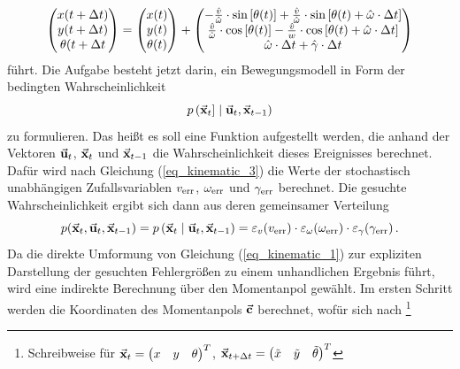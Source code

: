 \begin{equation}
\label{eq_kinematic_3}
\begin{pmatrix}
x(t+\Delta t) \\ y(t+\Delta t) \\ \theta(t+\Delta t
\end{pmatrix} 
=
\begin{pmatrix}
x(t) \\ y(t) \\ \theta(t)
\end{pmatrix} + \begin{pmatrix}
-\frac{\hat{v}}{\hat{\omega}}\cdot\text{sin}\left[ {\theta(t)} \right] + \frac{\hat{v}}{\hat{\omega}}\cdot \text{sin}\left[ {\theta(t)+\hat{\omega} \cdot \Delta t} \right] \\
\frac{\hat{v}}{\hat{\omega}}\cdot \text{cos}\left[ {\theta(t)} \right] - \frac{\hat{v}}{w}\cdot \text{cos}\left[ {\theta(t)+\hat{\omega} \cdot \Delta t} \right]\\
\hat{\omega}\cdot \Delta t + \hat{\gamma}\cdot \Delta t
\end{pmatrix}
\end{equation}
führt. Die Aufgabe besteht jetzt darin, ein Bewegungsmodell in Form der bedingten Wahrscheinlichkeit
\begin{equation}
p\left({\vec{\mathbf{x}}_t]} \hspace{1mm} \vert \hspace{1mm} {\vec{\mathbf{u}}_t, \vec{\mathbf{x}}_{t-1}}\right)
\end{equation}
zu formulieren. Das heißt es soll eine Funktion aufgestellt werden, die anhand der Vektoren $\vec{\mathbf{u}}_t$, $\vec{\mathbf{x}}_t$ und $\vec{\mathbf{x}}_{t-1}$ die Wahrscheinlichkeit dieses Ereignisses berechnet. Dafür wird nach Gleichung (\ref{eq_kinematic_3}) die Werte der stochastisch unabhängigen Zufallsvariablen $v_{\text{err}}$, $\omega_{\text{err}}$ und $\gamma_{\text{err}}$ berechnet. Die gesuchte Wahrscheinlichkeit ergibt sich dann aus deren gemeinsamer Verteilung
\begin{equation}
p(\vec{\mathbf{x}}_t, \vec{\mathbf{u}}_t, \vec{\mathbf{x}}_{t-1}) = p\left({\vec{\mathbf{x}}_t} \hspace{1mm} \vert \hspace{1mm} {\vec{\mathbf{u}}_t, \vec{\mathbf{x}}_{t-1}}\right) = \varepsilon_v(v_{\text{err}})\cdot \varepsilon_\omega(\omega_{\text{err}})\cdot \varepsilon_\gamma(\gamma_{\text{err}})\,.
\end{equation}
Da die direkte Umformung von Gleichung (\ref{eq_kinematic_1}) zur expliziten Darstellung der gesuchten Fehlergrößen zu einem unhandlichen Ergebnis führt, wird eine indirekte Berechnung über den Momentanpol gewählt. Im ersten Schritt werden die Koordinaten des Momentanpols $\vec{\mathbf{c}}$ berechnet, wofür sich nach \cite[S. 130]{ProbRob} \footnote{Schreibweise für $\vec{\mathbf{x}}_t = \begin{pmatrix}
x & y &\theta
\end{pmatrix}^T$, $\vec{\mathbf{x}}_{t+\Delta t} = \begin{pmatrix}
\tilde{x} & \tilde{y} &\tilde{\theta}
\end{pmatrix}^T$}
